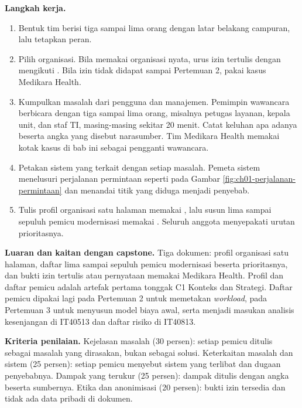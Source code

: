 \textbf{Langkah kerja.}
\begin{enumerate}
  \item Bentuk tim berisi tiga sampai lima orang dengan latar belakang campuran, lalu
        tetapkan peran.
  \item Pilih organisasi. Bila memakai organisasi nyata, urus izin tertulis dengan
        mengikuti . Bila izin
        tidak didapat sampai Pertemuan 2, pakai kasus Medikara Health.
  \item Kumpulkan masalah dari pengguna dan manajemen. Pemimpin wawancara berbicara
        dengan tiga sampai lima orang, misalnya petugas layanan, kepala unit, dan staf
        TI, masing-masing sekitar 20 menit. Catat keluhan apa adanya beserta angka yang
        disebut narasumber. Tim Medikara Health memakai kotak kasus di bab ini sebagai
        pengganti wawancara.
  \item Petakan sistem yang terkait dengan setiap masalah. Pemeta sistem menelusuri
        perjalanan permintaan seperti pada Gambar \ref{fig:ch01-perjalanan-permintaan}
        dan menandai titik yang diduga menjadi penyebab.
  \item Tulis profil organisasi satu halaman memakai
        , lalu susun lima sampai
        sepuluh pemicu modernisasi memakai
        . Seluruh anggota
        menyepakati urutan prioritasnya.
\end{enumerate}

\textbf{Luaran dan kaitan dengan capstone.} Tiga dokumen: profil organisasi satu
halaman, daftar lima sampai sepuluh pemicu modernisasi beserta prioritasnya, dan bukti
izin tertulis atau pernyataan memakai Medikara Health. Profil dan daftar pemicu adalah
artefak pertama tonggak C1 Konteks dan Strategi. Daftar pemicu dipakai lagi pada
Pertemuan 2 untuk memetakan \textit{workload}, pada Pertemuan 3 untuk menyusun model
biaya awal, serta menjadi masukan analisis kesenjangan di IT40513 dan daftar risiko di
IT40813.

\textbf{Kriteria penilaian.} Kejelasan masalah (30 persen): setiap pemicu ditulis
sebagai masalah yang dirasakan, bukan sebagai solusi. Keterkaitan masalah dan sistem (25
persen): setiap pemicu menyebut sistem yang terlibat dan dugaan penyebabnya. Dampak yang
terukur (25 persen): dampak ditulis dengan angka beserta sumbernya. Etika dan
anonimisasi (20 persen): bukti izin tersedia dan tidak ada data pribadi di dokumen.

